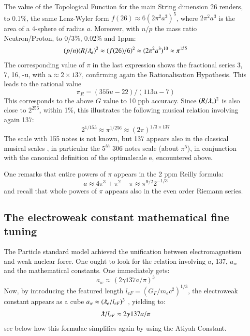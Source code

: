 \documentclass[twoside,draft]{article}
\begin{document}
\begin{sloppypar}
{The value of the Topological Function for the main String
 dimension 26 renders, to 0.1\%, the same Lenz-Wyler form $f(26) \approx 6(2\pi^{2} a^{3} )^{5}$, where $2\pi^{2}a^{3}$ is the area of a 4-sphere of radius $a$. Moreover, with $n/p$ the mass ratio Neutron/Proton, to 0/3\%, 0.02\% and 1ppm:
$$(p/n) (R/\lambdabar_{e})^{2} \approx (f(26)/6)^{2} \approx (2\pi^{2} a^{3})^{10} \approx \pi^{155}$$
The corresponding value of $\pi$ in the last expression shows the fractional series 3, 7, 16, -u, with $u \approx
2 \times 137$, confirming again the Rationalisation Hypothesis. This leads to the rational value
\begin{equation}
\pi_{R} = (355u-22)/(113u-7) 
\end{equation}
This corresponds to the above $G$ value to 10 ppb accuracy.
Since $(R/\lambdabar_{e})^{2}$ is also close to $2^{256}$, within 1\%, this illustrates the following musical relation involving again 137:
$$2^{1/155} \approx \pi^{1/256} \approx (2\pi)^{1/3 \times 137}$$
The scale with 155 notes is not known, but 137 appears also in the classical musical scales \cite{Sanchez1}, in
particular the $5^{th}$ 306 notes scale (about $\pi^{5}$), in conjunction with the canonical definition of the optimalscale e, encountered above.

One remarks that entire powers of $\pi$ appears in the 2 ppm Reilly formula: 
\begin{equation}
a \approx 4\pi^{3} + \pi^{2} + \pi \approx \pi^{9/2}2^{-1/3}
\end{equation}
and recall that whole powers of $\pi$ appears also in the even order Riemann series.

\subsection {The electroweak constant mathematical fine tuning}

The Particle standard model achieved the unification between electromagnetism and weak
nuclear force. One ought to look for the relation involving $a$, 137, $a_{w}$ and the mathematical constants. One
immediately gets:
\begin{equation}
a_{w} \approx (2\gamma 137 a/\pi)^{3}
\end{equation}
Now, by introducing the featured length $l_{eF} = (G_{F}/m_{e} c^{2})^{1/3}$, the electroweak constant appears as
a cube $a_{w} \approx (\lambdabar_{e}/l_{eF})^{3}$ , yielding to:
\begin{equation}
\lambdabar/l_{eF} \approx 2\gamma 137 a/\pi
\end{equation}
see below how this formulae simplifies again by using the Atiyah Constant.

}
\end{sloppypar}
\end{document}

